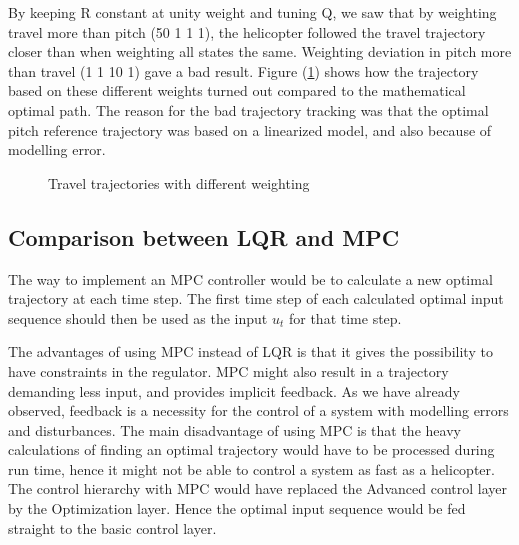 By keeping R constant at unity weight and tuning Q, we saw that by weighting travel more than pitch (50 1 1 1), the helicopter followed the travel trajectory closer than when weighting all states the same. Weighting deviation in pitch more than travel (1 1 10 1) gave a bad result. Figure (\ref{fig:day3_plot_all}) shows how the trajectory based on these different weights turned out compared to the mathematical optimal path. The reason for the bad trajectory tracking was that the optimal pitch reference trajectory was based on a linearized model, and also because of modelling error.
\begin{figure}[ht!]
	\centering
	\caption{Travel trajectories with different weighting}
	\label{fig:day3_plot_all}
\end{figure}

\subsection{Comparison between LQR and MPC}
The way to implement an MPC controller would be to calculate a new optimal trajectory at each time step. The first time step of each calculated optimal input sequence should then be used as the input $u_t$ for that time step.

The advantages of using MPC instead of LQR is that it gives the possibility to have constraints in the regulator. MPC might also result in a trajectory demanding less input, and provides implicit feedback. As we have already observed, feedback is a necessity for the control of a system with modelling errors and disturbances. 
The main disadvantage of using MPC is that the heavy calculations of finding an optimal trajectory would have to be processed during run time, hence it might not be able to control a system as fast as a helicopter.
The control hierarchy with MPC would have replaced the Advanced control layer by the Optimization layer. Hence the optimal input sequence would be fed straight to the basic control layer.
